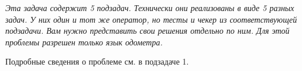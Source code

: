 \it{Эта задача содержит 5 подзадач. Технически они реализованы в виде 5 разных задач. У них один и тот же оператор, но тесты и чекер из соответствующей подзадачи. Вам нужно представить свои решения отдельно по ним. Для этой проблемы разрешен только язык одометра.}

Подробные сведения о проблеме см. в подзадаче 1.